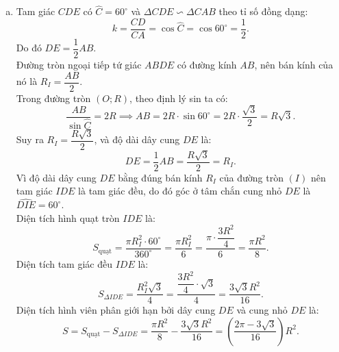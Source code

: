 \begin{bt}
{\begin{enumerate}[a)]
	Tương tự, $\widehat{CBK} = 90^\circ \implies BK \perp BC$, mà $AD \perp BC \implies AH \perp BC$, suy ra $BK \parallel AH$.\\
	Tứ giác $AKBH$ có hai cặp cạnh đối song song nên là một hình bình hành.\\
	Vì $I$ là trung điểm của đường chéo $AB$ của hình bình hành $AKBH$, nên $I$ cũng là trung điểm của đường chéo thứ hai $HK$.\\
	Do đó ba điểm $H, I, K$ thẳng hàng.
	\item Tam giác $CDE$ có $\widehat{C} = 60^\circ$ và $\Delta CDE \backsim \Delta CAB$ theo tỉ số đồng dạng:
	$$ k = \dfrac{CD}{CA} = \cos \widehat{C} = \cos 60^\circ = \dfrac{1}{2}. $$
	Do đó $DE = \dfrac{1}{2}AB$.\\
	Đường tròn ngoại tiếp tứ giác $ABDE$ có đường kính $AB$, nên bán kính của nó là $R_I = \dfrac{AB}{2}$.\\
	Trong đường tròn $(O; R)$, theo định lý sin ta có:
	$$ \dfrac{AB}{\sin \widehat{C}} = 2R \implies AB = 2R \cdot \sin 60^\circ = 2R \cdot \dfrac{\sqrt{3}}{2} = R\sqrt{3}. $$
	Suy ra $R_I = \dfrac{R\sqrt{3}}{2}$, và độ dài dây cung $DE$ là:
	$$ DE = \dfrac{1}{2}AB = \dfrac{R\sqrt{3}}{2} = R_I. $$
	Vì độ dài dây cung $DE$ bằng đúng bán kính $R_I$ của đường tròn $(I)$ nên tam giác $IDE$ là tam giác đều, do đó góc ở tâm chắn cung nhỏ $DE$ là $\widehat{DIE} = 60^\circ$.\\
	Diện tích hình quạt tròn $IDE$ là:
	$$ S_{\text{quạt}} = \dfrac{\pi R_I^2 \cdot 60^\circ}{360^\circ} = \dfrac{\pi R_I^2}{6} = \dfrac{\pi \cdot \dfrac{3R^2}{4}}{6} = \dfrac{\pi R^2}{8}. $$
	Diện tích tam giác đều $IDE$ là:
	$$ S_{\Delta IDE} = \dfrac{R_I^2\sqrt{3}}{4} = \dfrac{\dfrac{3R^2}{4} \cdot \sqrt{3}}{4} = \dfrac{3\sqrt{3}R^2}{16}. $$
	Diện tích hình viên phân giới hạn bởi dây cung $DE$ và cung nhỏ $DE$ là:
	$$ S = S_{\text{quạt}} - S_{\Delta IDE} = \dfrac{\pi R^2}{8} - \dfrac{3\sqrt{3}R^2}{16} = \left(\dfrac{2\pi - 3\sqrt{3}}{16}\right)R^2. $$
\end{enumerate}
}
\end{bt}

